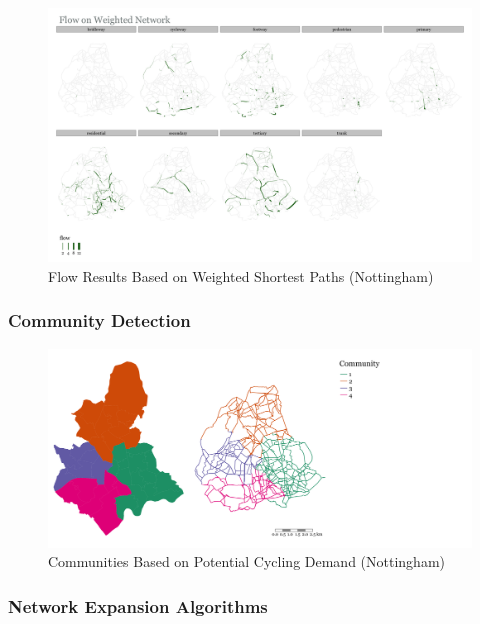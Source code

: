 \documentclass[
]{article}
\begin{document}
\begin{figure}

{\centering \includegraphics[width=0.75\linewidth]{data/Nottingham/Plots/flows_facet_weighted_Nottingham} 

}

\caption{Flow Results Based on Weighted Shortest Paths (Nottingham)}\label{fig:flowsfacetweightedNottingham}
\end{figure}

\clearpage

\subsubsection{Community Detection}

\begin{figure}

{\centering \includegraphics[width=0.9\linewidth]{data/Nottingham/Plots/communities_alternative_Nottingham} 

}

\caption{Communities Based on Potential Cycling Demand (Nottingham)}\label{fig:communitiesNottingham}
\end{figure}

\subsubsection{Network Expansion Algorithms}
\end{document}
